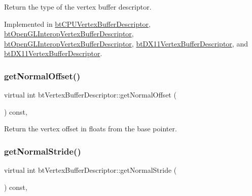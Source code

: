 Return the type of the vertex buffer descriptor. 

Implemented in \hyperlink{classbtCPUVertexBufferDescriptor_ab0ade8a42a69f574e48abb88b7e5350e}{bt\+C\+P\+U\+Vertex\+Buffer\+Descriptor}, \hyperlink{classbtOpenGLInteropVertexBufferDescriptor_ad53252ccc0b8f46e1b0af4d8ba1cd445}{bt\+Open\+G\+L\+Interop\+Vertex\+Buffer\+Descriptor}, \hyperlink{classbtOpenGLInteropVertexBufferDescriptor_ad53252ccc0b8f46e1b0af4d8ba1cd445}{bt\+Open\+G\+L\+Interop\+Vertex\+Buffer\+Descriptor}, \hyperlink{classbtDX11VertexBufferDescriptor_aaa92499e7319fda25f7cd787b14c4933}{bt\+D\+X11\+Vertex\+Buffer\+Descriptor}, and \hyperlink{classbtDX11VertexBufferDescriptor_aaa92499e7319fda25f7cd787b14c4933}{bt\+D\+X11\+Vertex\+Buffer\+Descriptor}.

\mbox{\label{classbtVertexBufferDescriptor_a38dab3efcecf209f8d2486b2cc6c2288}} 
\subsubsection{\texorpdfstring{get\+Normal\+Offset()}{getNormalOffset()}}
{\footnotesize\ttfamily virtual int bt\+Vertex\+Buffer\+Descriptor\+::get\+Normal\+Offset (\begin{DoxyParamCaption}{ }\end{DoxyParamCaption}) const\hspace{0.3cm}{\ttfamily [inline]}, {\ttfamily [virtual]}}

Return the vertex offset in floats from the base pointer. \mbox{\label{classbtVertexBufferDescriptor_a7a5c20d4d889bfc14d169c9d94586bb4}} 
\subsubsection{\texorpdfstring{get\+Normal\+Stride()}{getNormalStride()}}
{\footnotesize\ttfamily virtual int bt\+Vertex\+Buffer\+Descriptor\+::get\+Normal\+Stride (\begin{DoxyParamCaption}{ }\end{DoxyParamCaption}) const\hspace{0.3cm}{\ttfamily [inline]}, {\ttfamily [virtual]}}

